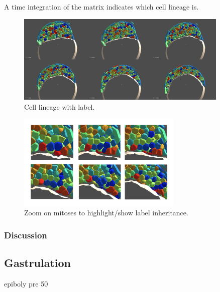   A time integration of the matrix indicates which cell lineage is. 
\begin{figure}
\begin{center}
\includegraphics[width=0.9\textwidth]{../../images/Cases_Studies/Case_4_intercalation/simulation/clonal/simulation_clonal.png}
\end{center}
\caption{Cell lineage with label.}
\label{simulation_clonal}
\end{figure}
\begin{figure}
\begin{center}
\includegraphics[width=0.7\textwidth]{../../images/Cases_Studies/Case_4_intercalation/simulation/mitosis_clonal/simulation_mitosis_clonal.png}
\end{center}
\caption{Zoom on mitoses to highlight/show label inheritance.}
\label{simulation_mitosis_clonal}
\end{figure}



\subsubsection{Discussion  }

\subsection{Gastrulation  }             epiboly pre 50%

